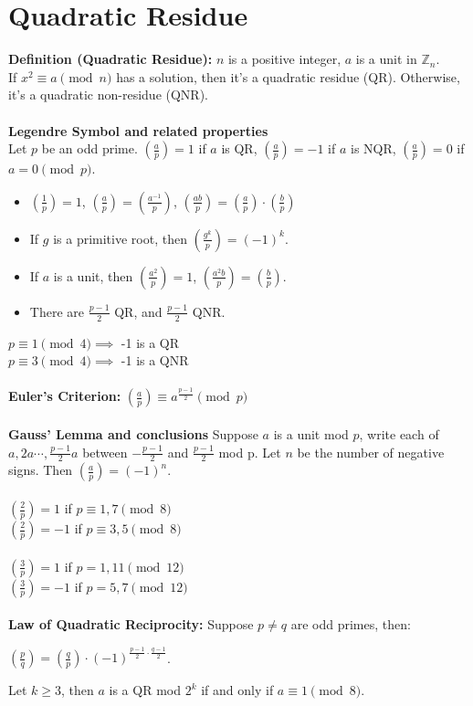 \documentclass[12pt]{article}
\begin{document}
\section*{Quadratic Residue}
\textbf{Definition (Quadratic Residue):} $n$ is a positive integer, $a$ is a unit in $\mathbb{Z}_n$.\\
If $x^2\equiv a\pmod n$ has a solution, then it's a quadratic residue (QR). Otherwise, it's a quadratic non-residue (QNR).\\
\\
\textbf{Legendre Symbol and related properties}\\
Let $p$ be an odd prime. $(\frac{a}{p})=1$ if $a$ is QR, $(\frac{a}{p})=-1$ if $a$ is NQR, $(\frac{a}{p})=0$ if $a=0\pmod p$.
\begin{itemize}
    \item $(\frac{1}{p})=1$, $(\frac{a}{p})=(\frac{a^{-1}}{p})$, $(\frac{ab}{p})=(\frac{a}{p})\cdot(\frac{b}{p})$
    \item If $g$ is a primitive root, then $(\frac{g^k}{p})=(-1)^k$.
    \item If $a$ is a unit, then $(\frac{a^2}{p})=1$, $(\frac{a^2b}{p})=(\frac{b}{p})$.
    \item There are $\frac{p-1}{2}$ QR, and $\frac{p-1}{2}$ QNR.
\end{itemize}
$p\equiv 1\pmod 4 \implies$ -1 is a QR\\
$p\equiv 3\pmod 4 \implies$ -1 is a QNR\\
\\
\textbf{Euler's Criterion:} $(\frac{a}{p})\equiv a^{\frac{p-1}{2}}\pmod p$\\
\\
\textbf{Gauss' Lemma and conclusions} Suppose $a$ is a unit mod $p$, write each of $a, 2a \cdots, \frac{p-1}{2}a$ between $-\frac{p-1}{2}$ and $\frac{p-1}{2}$ mod p. Let $n$ be the number of negative signs. Then $(\frac{a}{p})=(-1)^n$.\\
\\
$(\frac{2}{p})=1$ if $p\equiv 1, 7\pmod 8$\\
$(\frac{2}{p})=-1$ if $p\equiv 3, 5\pmod 8$\\
\\
$(\frac{3}{p})=1$ if $p=1, 11\pmod {12}$\\
$(\frac{3}{p})=-1$ if $p=5, 7\pmod {12}$\\
\\
\textbf{Law of Quadratic Reciprocity:} Suppose $p\neq q$ are odd primes, then:
\begin{center}  
    $(\frac{p}{q})=(\frac{q}{p})\cdot (-1)^{\frac{p-1}{2}\cdot \frac{q-1}{2}}$.
\end{center}
Let $k\geq 3$, then $a$ is a QR mod $2^k$ if and only if $a\equiv 1\pmod 8$.
\end{document}
